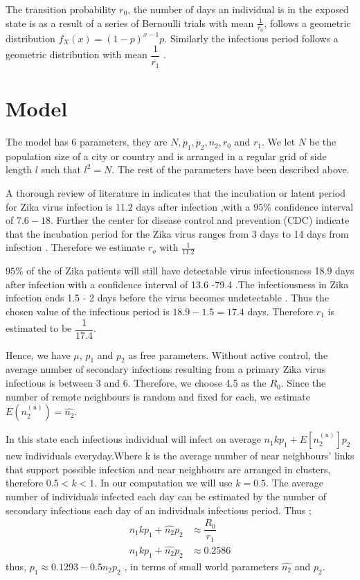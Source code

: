  The transition probability $r_0$, the number of days an individual is in the exposed state is as a result of a series of Bernoulli trials with mean $\frac{1}{r_0}$, follows a geometric distribution $f_X (x) = (1-p) ^ {x-1} p$. Similarly the infectious period follows a geometric distribution with mean $\dfrac{1}{r_1}$ \citep{fu2013propagation}.

\section{Model}
The model has 6 parameters, they are $N, p_1, p_2, n_2, r_0$ and $r_1$. We let $N$ be the population size of a city or country and is arranged in a regular grid of side length $l $ such that $l^2 = N$. The rest of the parameters have been described above.

A thorough review of literature in \cite{lessler2016times} indicates that the incubation or latent period for Zika virus infection is $11.2$ days after infection ,with a $95 \%$ confidence interval of $7.6 -18$. Further the center for disease control and prevention (CDC) indicate that the incubation period for the Zika virus ranges from 3 days to 14 days from infection \citep{krow2017estimated}. Therefore we estimate $r_o$ with $\frac{1}{11.2}$

  $95\%$ of the of Zika patients will still have detectable virus infectiousness 18.9 days after infection with a confidence interval of 13.6 -79.4 \citep{lessler2016times}.The infectiousness in Zika infection ends 1.5 - 2 days before the virus becomes undetectable \citep{funk2016comparative}. Thus the chosen value of the infectious period is $18.9 - 1.5 = 17.4$ days. Therefore $r_1$ is estimated to be $\dfrac{1}{17.4}$.

  Hence, we have $\mu$, $p_1$ and $p_2$  as free parameters. Without active control, the average number of secondary infections resulting from a primary  Zika  virus infectious is between 3 and 6. Therefore, we choose 4.5 as the $R_0$. Since the number of remote neighbours is random and fixed for each, we estimate $E (n^ {(u)} _2) = \widehat{n_2}$.

In this state each infectious individual will infect on average $n_1kp_1 + E[n^{(u)}_2]p_2 $ new individuals everyday.Where k is the average number of near neighbours' links that support possible infection and near neighbours are arranged in clusters, therefore $0.5 < k <1$. In our computation we will use $k=0.5$. The average number  of individuals infected each day can be estimated by the number of secondary infections each day of an individuals infectious period. Thus ;
\begin{align}
n_1k p_1 + \widehat{n_2} p_2 &\approx \dfrac{R_0}{r_1} 
\\ n_1k p_1 + \widehat{n_2} p_2 &\approx 0.2586 \label{eqn 5.32}
\end{align}
thus, 
$p_1 \approx   0.1293- 0.5 \widehat{n_2} p_2$ , in terms of small world parameters $\widehat{n_2}$ and $p_2$.

